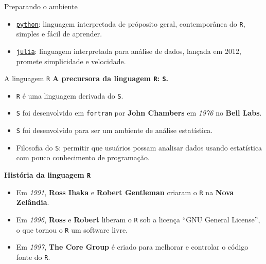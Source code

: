 \documentclass[
  10pt,
  ignorenonframetext,
]{beamer}
\providecommand{\tightlist}{%
  \setlength{\itemsep}{0pt}\setlength{\parskip}{0pt}}
\begin{document}
\begin{frame}[fragile]{Preparando o ambiente}
\begin{itemize}
  \begin{itemize}
  \tightlist
  \item
    \href{https://www.python.org}{\texttt{python}}: linguagem
    interpretada de próposito geral, contemporânea do \texttt{R},
    simples e fácil de aprender.
  \item
    \href{https://julialang.org}{\texttt{julia}}: linguagem interpretada
    para análise de dados, lançada em 2012, promete simplicidade e
    velocidade.
  \end{itemize}
\end{itemize}
\end{frame}

\begin{frame}[fragile]{A linguagem \texttt{R}}
\protect\hypertarget{a-linguagem-r}{}
\textbf{A precursora da linguagem \texttt{R}: \texttt{S}.}

\begin{itemize}
\tightlist
\item
  \texttt{R} é uma linguagem derivada do \texttt{S}.
\item
  \texttt{S} foi desenvolvido em \texttt{fortran} por \textbf{John
  Chambers} em \emph{1976} no \textbf{Bell Labs}.
\item
  \texttt{S} foi desenvolvido para ser um ambiente de análise
  estatística.
\item
  Filosofia do \texttt{S}: permitir que usuários possam analisar dados
  usando estatística com pouco conhecimento de programação.
\end{itemize}

\textbf{História da linguagem \texttt{R}}

\begin{itemize}
\tightlist
\item
  Em \emph{1991}, \textbf{Ross Ihaka} e \textbf{Robert Gentleman}
  criaram o \texttt{R} na \textbf{Nova Zelândia}.
\item
  Em \emph{1996}, \textbf{Ross} e \textbf{Robert} liberam o \texttt{R}
  sob a licença ``GNU General License'', o que tornou o \texttt{R} um
  software livre.
\item
  Em \emph{1997}, \textbf{The Core Group} é criado para melhorar e
  controlar o código fonte do \texttt{R}.
\end{itemize}
\end{frame}
\end{document}
